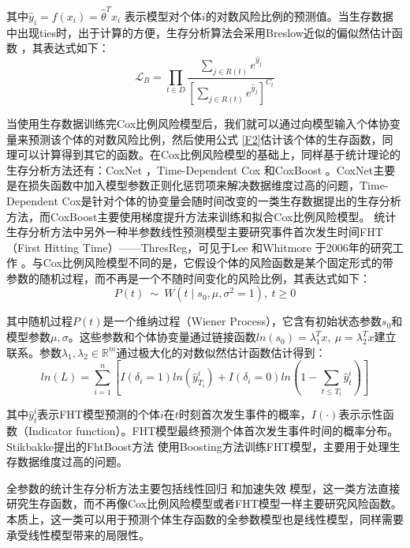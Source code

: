其中$\hat{y}_i=f(x_i)=\hat{\theta}^T x_i$ 表示模型对个体$i$的对数风险比例的预测值。当生存数据中出现ties时，出于计算的方便，生存分析算法会采用Breslow近似的偏似然估计函数 ，其表达式如下：
\begin{equation}
\mathcal{L}_B = \prod_{t\in D} \frac{\sum_{j\in R(t)} e^{\hat{y}_j}}{[\sum_{j\in R(t)} e^{\hat{y}_j}]^{C_t}} \label{F6}
\end{equation}

当使用生存数据训练完Cox比例风险模型后，我们就可以通过向模型输入个体协变量来预测该个体的对数风险比例，然后使用公式 \eqref{F2}估计该个体的生存函数，同理可以计算得到其它的函数。在Cox比例风险模型的基础上，同样基于统计理论的生存分析方法还有：CoxNet ，Time-Dependent Cox 和CoxBoost 。CoxNet主要是在损失函数中加入模型参数正则化惩罚项来解决数据维度过高的问题，Time-Dependent Cox是针对个体的协变量会随时间改变的一类生存数据提出的生存分析方法，而CoxBoost主要使用梯度提升方法来训练和拟合Cox比例风险模型。
统计生存分析方法中另外一种半参数线性预测模型主要研究事件首次发生时间FHT（First Hitting Time）——ThresReg，可见于Lee 和Whitmore 于2006年的研究工作 。与Cox比例风险模型不同的是，它假设个体的风险函数是某个固定形式的带参数的随机过程，而不再是一个不随时间变化的风险比例，其表达式如下：
\begin{equation}
P(t)\ \sim \ W(t \mid s_0, \mu, \sigma^2=1),\ t\ge 0 \label{F7}
\end{equation}

其中随机过程$P(t)$是一个维纳过程（Wiener Process），它含有初始状态参数$s_0$和模型参数$\mu, \sigma$。这些参数和个体协变量通过链接函数$ln⁡(s_0 )=\lambda_1^T x,\ \mu = \lambda_2^T x$建立联系。参数$\lambda_1,\lambda_2\in \mathbb{R}^m$通过极大化的对数似然估计函数估计得到：
\begin{equation}
ln(L)=\sum_{i=1}^{n} \left[ I(\delta_i=1)ln(\hat{y}_{T_i}^i) + I(\delta_i=0) ln(1-\sum_{t\le T_i}\hat{y}_t^i) \right] \label{F8}
\end{equation}

其中$\hat{y}_t^i$表示FHT模型预测的个体$i$在$t$时刻首次发生事件的概率，$I(\cdot)$表示示性函数（Indicator function）。FHT模型最终预测个体首次发生事件时间的概率分布。Stikbakke提出的FhtBoost方法 使用Boosting方法训练FHT模型，主要用于处理生存数据维度过高的问题。

全参数的统计生存分析方法主要包括线性回归 和加速失效 模型，这一类方法直接研究生存函数，而不再像Cox比例风险模型或者FHT模型一样主要研究风险函数。本质上，这一类可以用于预测个体生存函数的全参数模型也是线性模型，同样需要承受线性模型带来的局限性。

